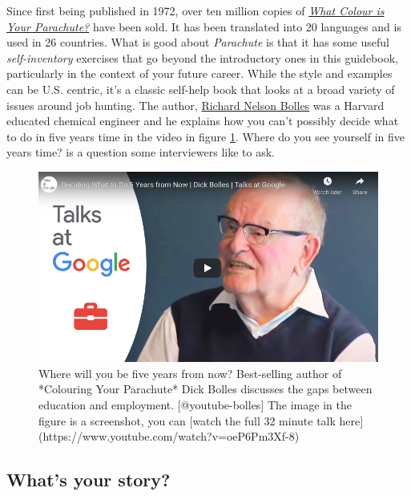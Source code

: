 \documentclass[
]{book}
\begin{document}
Since first being published in 1972, over ten million copies of \emph{\href{https://en.wikipedia.org/wiki/What_Color_is_Your_Parachute\%3F}{What Colour is Your Parachute?}} have been sold. It has been translated into 20 languages and is used in 26 countries. What is good about \emph{Parachute} is that it has some useful \emph{self-inventory} exercises that go beyond the introductory ones in this guidebook, particularly in the context of your future career. While the style and examples can be U.S. centric, it's a classic self-help book that looks at a broad variety of issues around job hunting. The author, \href{https://en.wikipedia.org/wiki/Richard_Nelson_Bolles}{Richard Nelson Bolles} was a Harvard educated chemical engineer and he explains how you can't possibly decide what to do in five years time in the video in figure \ref{fig:bolles-fig}. Where do you see yourself in five years time? is a question some interviewers like to ask.

\begin{figure}

{\centering \includegraphics[width=0.99\linewidth]{images/youtube-bolles} 

}

\caption{Where will you be five years from now? Best-selling author of *Colouring Your Parachute* Dick Bolles discusses the gaps between education and employment. [@youtube-bolles] The image in the figure is a screenshot, you can [watch the full 32 minute talk here](https://www.youtube.com/watch?v=oeP6Pm3Xf-8) }\label{fig:bolles-fig}
\end{figure}

\hypertarget{whats-your-story}{%
\subsection{What's your story?}\label{whats-your-story}}
\end{document}
